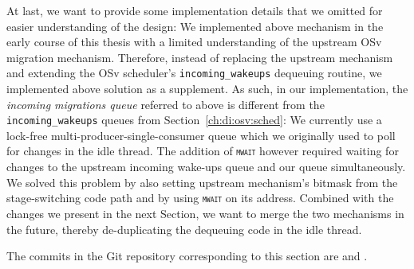 \documentclass[12pt,a4paper]{book}
\begin{document}
At last, we want to provide some implementation details that we omitted for easier understanding of the design:
We implemented above mechanism in the early course of this thesis with a limited understanding of the upstream OSv migration mechanism.
Therefore, instead of replacing the upstream mechanism and extending the OSv scheduler's \lstinline[style=figurecpp]{incoming_wakeups} dequeuing routine,
we implemented above solution as a supplement.
As such, in our implementation, the \emph{incoming migrations queue} referred to above is different from the \lstinline[style=figurecpp]{incoming_wakeups} queues from Section~\ref{ch:di:osv:sched}:
We currently use a lock-free multi-producer-single-consumer queue which we originally used to poll for changes in the idle thread.
The addition of \textsc{\texttt{mwait}} however required waiting for changes to the upstream incoming wake-ups queue and our queue simultaneously.
We solved this problem by also setting upstream mechanism's bitmask from the stage-switching code path and by using \textsc{\texttt{mwait}} on its address.
Combined with the changes we present in the next Section, we want to merge the two mechanisms in the future, thereby de-duplicating the dequeuing code in the idle thread.

The commits in the Git repository corresponding to this section are  and .
\end{document}
